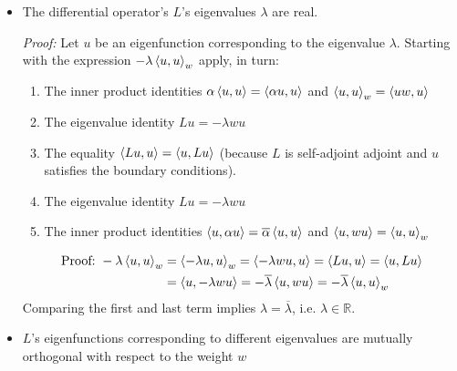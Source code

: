 \documentclass[11pt, a4paper]{article}
\newcommand{\R}{\mathbb{R}} %
\begin{document}
\begin{itemize}
	\item The differential operator's $ L $'s eigenvalues $ \lambda $ are real.
	
	\textit{Proof:} Let $ u $ be an eigenfunction corresponding to the eigenvalue $ \lambda $. Starting with the expression $ -\lambda  \expval{u, u}_{w} $ apply, in turn:
	\begin{enumerate}
		\item  The inner product identities $ \alpha \expval{u, u} = \expval{\alpha u, u} $ and $ \expval{u, u}_{w} = \expval{uw, u} $
		\item The eigenvalue identity $ Lu = -\lambda w u $
		\item The equality $ \expval{Lu, u} = \expval{u, Lu} $ (because $ L $ is self-adjoint adjoint and  $ u $ satisfies the boundary conditions).
		\item The eigenvalue identity $ Lu = -\lambda w u $
		\item The inner product identities $ \expval{ u,\alpha u} =  \overline{\alpha} \expval{u, u} $ and $ \expval{u, wu} = \expval{u, u}_{w} $
	\end{enumerate}
	\vspace{-4mm}
	\begin{align*}
		\text{Proof:} \ -\lambda  \expval{u, u}_{w} &=  \expval{- \lambda u, u}_{w} = \expval{- \lambda w u, u} = \expval{L u, u} = \expval{u, Lu}\\
		&= \expval{u, -\lambda w u} = -\overline{\lambda}\expval{u, w u} = -\overline{\lambda}\expval{u, u}_{w}
	\end{align*}
	Comparing the first and last term implies $ \lambda = \overline{\lambda} $, i.e. $ \lambda \in \R $.
	
	\item $ L $'s eigenfunctions corresponding to different eigenvalues are mutually orthogonal with respect to the weight $ w $


\end{itemize}
\end{document}
